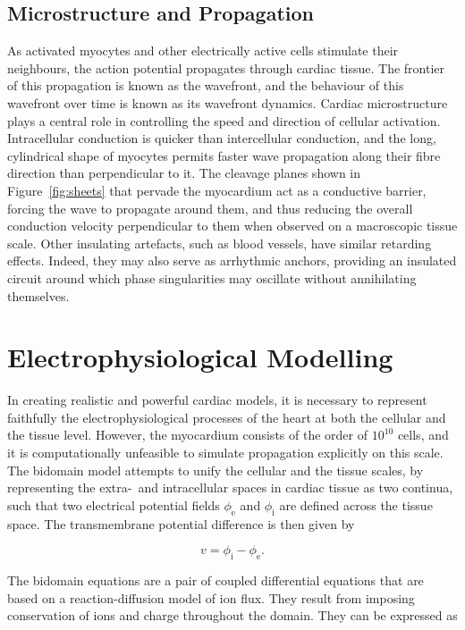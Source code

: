   \subsection{Microstructure and Propagation}
  \label{sub:microstructure_and_propagation}
    As activated myocytes and other electrically active cells stimulate their neighbours, the action potential propagates through cardiac tissue. The frontier of this propagation is known as the wavefront, and the behaviour of this wavefront over time is known as its wavefront dynamics. Cardiac microstructure plays a central role in controlling the speed and direction of cellular activation. Intracellular conduction is quicker than intercellular conduction, and the long, cylindrical shape of myocytes permits faster wave propagation along their fibre direction than perpendicular to it. The cleavage planes shown in Figure~\ref{fig:sheets} that pervade the myocardium act as a conductive barrier, forcing the wave to propagate around them, and thus reducing the overall conduction velocity perpendicular to them when observed on a macroscopic tissue scale. Other insulating artefacts, such as blood vessels, have similar retarding effects. Indeed, they may also serve as arrhythmic anchors, providing an insulated circuit around which phase singularities may oscillate without annihilating themselves.
    
\section{Electrophysiological Modelling}
\label{sec:electrophysiological_modelling}
  In creating realistic and powerful cardiac models, it is necessary to represent faithfully the electrophysiological processes of the heart at both the cellular and the tissue level. However, the myocardium consists of the order of $10^{10}$ cells, and it is computationally unfeasible to simulate propagation explicitly on this scale. The bidomain model attempts to unify the cellular and the tissue scales, by representing the extra-~and intracellular spaces in cardiac tissue as two continua, such that two electrical potential fields $\phi_\text{e}$ and $\phi_\text{i}$ are defined across the tissue space. The transmembrane potential difference is then given by
  
  \begin{equation}
    v = \phi_\text{i} - \phi_\text{e}.
  \end{equation}
  
  The bidomain equations are a pair of coupled differential equations that are based on a reaction-diffusion model of ion flux. They result from imposing conservation of ions and charge throughout the domain. They can be expressed as
  

